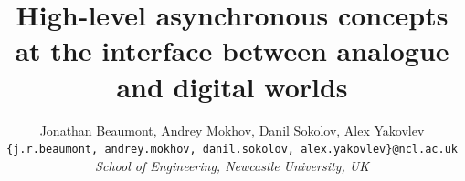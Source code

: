\documentclass[british, journal]{IEEEtran}
\begin{document}
%
%
%
%
%
%
%
%
%
%
%
%
%
%
%
%
%
%
%
%

\title{High-level asynchronous concepts at the interface between analogue and
digital worlds}
\author{Jonathan Beaumont, Andrey Mokhov, Danil Sokolov, Alex Yakovlev\\
\texttt{\{j.r.beaumont, andrey.mokhov, danil.sokolov, alex.yakovlev\}@ncl.ac.uk}\\
\emph{School of Engineering, Newcastle University,
UK}}
\end{document}
